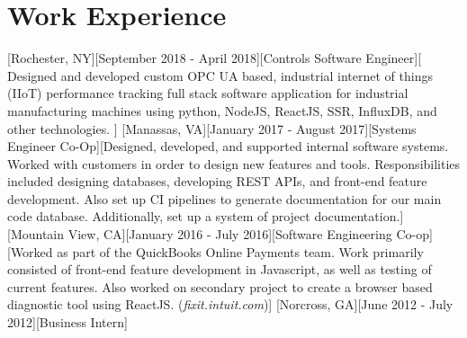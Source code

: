\documentclass[10pt]{article} %
\begin{document}
		\section{Work Experience}
		[Rochester, NY][September 2018 - April 2018][Controls Software Engineer][%
		Designed and developed custom OPC UA based, industrial internet of things (IIoT) performance tracking full stack software application for industrial manufacturing machines using python, NodeJS, ReactJS, SSR, InfluxDB, and other technologies.
		]%
		[Manassas, VA][January 2017 - August 2017][Systems Engineer Co-Op][Designed, developed, and supported internal software systems. Worked with customers in order to design new features and tools. Responsibilities included designing databases, developing REST APIs, and front-end feature development. Also set up CI pipelines to generate documentation for our main code database. Additionally, set up a system of project documentation.]%
		[Mountain View, CA][January 2016 - July 2016][Software Engineering Co-op][Worked as part of the QuickBooks Online Payments team. Work primarily consisted of front-end feature development in Javascript, as well as testing of current features. Also worked on secondary project to create a browser based diagnostic tool using ReactJS. ({\it fixit.intuit.com})]%
		[Norcross, GA][June 2012 - July 2012][Business Intern]%
\end{document}
